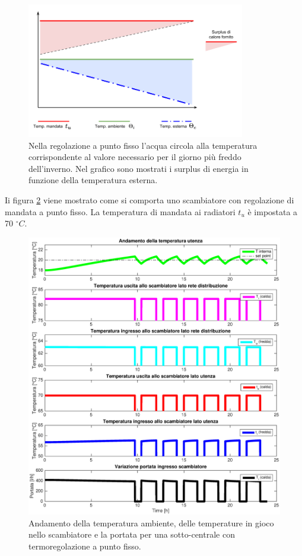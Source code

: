 \documentclass[laurea,oneside,11pt]{USiena_tesiLM}
\begin{document}
\begin{figure}[!ht]
\centering
\includegraphics[width=0.85\textwidth]{figure/surplus} 
\caption{Nella regolazione a punto fisso l'acqua circola alla temperatura corrispondente al valore necessario per il giorno più freddo dell'inverno. Nel grafico sono mostrati i surplus di energia in funzione della temperatura esterna.}
\label{fig:surplus}
\end{figure}

Ii figura \ref{fig:reg_mandata} viene mostrato come si comporta uno scambiatore con regolazione di mandata a punto fisso. La temperatura di mandata ai radiatori $t_u$ è impostata a 70  $^{\circ}C$.  

\begin{figure}[!ht]
\centering
\includegraphics[width=\textwidth]{figure/reg_mandata} 
\caption{Andamento della temperatura ambiente, delle temperature in gioco nello scambiatore e la portata per una sotto-centrale con termoregolazione a punto fisso.}
\label{fig:reg_mandata}
\end{figure}
\end{document}
